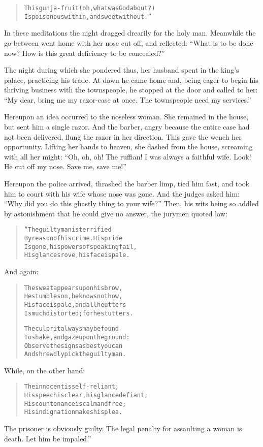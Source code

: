 \documentclass[article, twoside, 14pt]{memoir}
\renewenvironment{verbatim}{%
\begin{quote}%
\vskip -10pt%
\begin{alltt}\normalfont\large}{\end{alltt}%
\end{quote}%
\vskip -10pt
} %
\begin{document}
\begin{verbatim}
This gunja-fruit (oh, what was God about?)
Is poisonous within, and sweet without.”
\end{verbatim}
In these meditations the night dragged drearily for the holy man.
Meanwhile the go-between went home with her nose cut off, and
reflected:
``What is to be done now? How is this great deficiency to be concealed?''

The night during which she pondered thus, her husband spent in the
king's palace, practicing his trade. At dawn he came home and,
being eager to begin his thriving business with the townspeople, he
stopped at the door and called to her:
``My dear, bring me my razor-case at once. The townspeople need my services.''

Hereupon an idea occurred to the noseless woman. She remained in
the house, but sent him a single razor. And the barber, angry
because the entire case had not been delivered, flung the razor in
her direction. This gave the wench her opportunity. Lifting her
hands to heaven, she dashed from the house, screaming with all her
might:
``Oh, oh, oh! The ruffian! I was always a faithful wife. Look! He cut off my nose. Save me, save me!''

Hereupon the police arrived, thrashed the barber limp, tied him
fast, and took him to court with his wife whose nose was gone. And
the judges asked him:
``Why did you do this ghastly thing to your wife?'' Then, his wits
being so addled by astonishment that he could give no answer, the
jurymen quoted law:

\begin{verbatim}
“The guilty man is terrified
By reason of his crime. His pride
Is gone, his powers of speaking fail,
His glances rove, his face is pale.
\end{verbatim}
And again:

\begin{verbatim}
The sweat appears upon his brow,
He stumbles on, he knows not how,
His face is pale, and all he utters
Is much distorted; for he stutters.

The culprit always may be found
To shake, and gaze upon the ground:
Observe the signs as best you can
And shrewdly pick the guilty man.
\end{verbatim}
While, on the other hand:

\begin{verbatim}
The innocent is self-reliant;
His speech is clear, his glance defiant;
His countenance is calm and free;
His indignation makes his plea.
\end{verbatim}
The prisoner is obviously guilty. The legal penalty for assaulting
a woman is death. Let him be impaled.”
\end{document}
